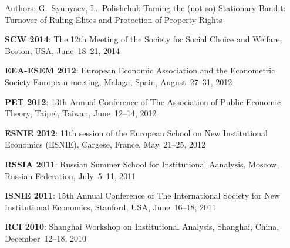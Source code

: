 

\begin{cventries}

  \cventry
    {Authors: G.~Syunyaev, L.~Polishchuk} %
    {Taming the (not so) Stationary Bandit: Turnover of Ruling Elites and Protection of Property Rights} %
    {} %
    {} %
    {
      \begin{cvitems} %
        \item {\textbf{SCW 2014}: The 12th Meeting of the Society for Social Choice and Welfare, Boston, USA, June~18--21, 2014}
        \item {\textbf{EEA-ESEM 2012}: European Economic Association and the Econometric Society European meeting, Malaga, Spain, August~27--31, 2012}
        \item {\textbf{PET 2012}: 13th Annual Conference of The Association of Public Economic Theory, Taipei, Taiwan, June~12--14, 2012}
        \item {\textbf{ESNIE 2012}: 11th session of the European School on New Institutional Economics (ESNIE), Cargese, France, May~21--25, 2012}
        \item {\textbf{RSSIA 2011}: Russian Summer School for Institutional Aanalysis, Moscow, Russian Federation, July~5--11, 2011}
        \item {\textbf{ISNIE 2011}: 15th Annual Conference of The International Society for New Institutional Economics, Stanford, USA, June~16--18, 2011}
        \item {\textbf{RCI 2010}: Shanghai Workshop on Institutional Analysis, Shanghai, China, December~12--18, 2010}
      \end{cvitems}
    }


\end{cventries}
